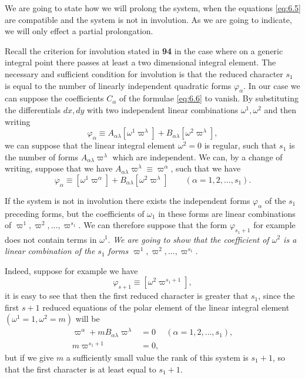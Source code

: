 We are going to state how we will prolong the system, when the equations \eqref{eq:6.5} are compatible and the system is not in involution. As we are going to indicate, we will only effect a partial prolongation.



\vspace{12pt}\fsec Recall the criterion for involution stated in \textsection\textbf{94} in the case where on a generic integral point there passes at least a two dimensional integral element. The necessary and sufficient condition for involution is that the reduced character $s_{1}$ is equal to the number of linearly independent quadratic forms $\varphi_{\alpha}$. In our case we can suppose the coefficients $C_{\alpha}$ of the formulae \eqref{eq:6.6} to vanish. By substituting the differentials $dx,dy$ with two independent linear combinations $\omega^{1},\omega^{2}$ and then writing
\[
\varphi_{\alpha}\equiv A_{\alpha\lambda}[\omega^{1}\varpi^{\lambda}]+B_{\alpha\lambda}[\omega^{2}\varpi^{\lambda}],
\]
we can suppose that the linear integral element $\omega^{2}=0$ is regular, such that $s_{1}$ is the number of forms $A_{\alpha\lambda}\varpi^{\lambda}$ which are independent. We can, by a change of writing, suppose that we have $A_{\alpha\lambda}\varpi^{\lambda}\equiv\varpi^{\alpha}$, such that we have
\begin{equation}
  \label{eq:6.7}
  \varphi_{\alpha}\equiv[\omega^{1}\varpi^{\alpha}]+B_{\alpha\lambda}[\omega^{2}\varpi^{\lambda}]\qquad(\alpha=1,2,\dots,s_{1}).
\end{equation}

If the system is not in involution there exists the independent forms $\varphi_{\alpha}$ of the $s_{1}$ preceding forms, but the coefficients of $\omega_{1}$ in these forms are linear combinations of $\varpi^{1},\varpi^{2},\dots,\varpi^{s_{1}}$. We can therefore suppose that the form $\varphi_{s_{1}+1}$ for example does not contain terms in $\omega^{1}$. \emph{We are going to show that the coefficient of $\omega^{2}$ is a linear combination of the $s_{1}$ forms $\varpi^{1},\varpi^{2},\dots,\varpi^{s_{1}}$}.

Indeed, suppose for example we have
\[
\varphi_{s+1}\equiv[\omega^{2}\varpi^{s_{1}+1}],
\]
it is easy to see that then the first reduced character is greater that $s_{1}$, since the first $s+1$  reduced equations of the polar element of the linear integral element $(\omega^{1}=1,\omega^{2}=m)$ will be
\begin{align*}
  \varpi^{\alpha}+mB_{\alpha\lambda}\varpi^{\lambda}&=0&(\alpha=1,2,\dots,s_{1}),\\
  m\varpi^{s_{1}+1}&=0,
\end{align*}
but if we give $m$ a sufficiently small value the rank of this system is $s_{1}+1$, so that the first character is at least equal to $s_{1}+1$.



